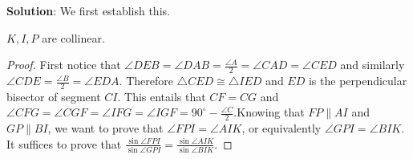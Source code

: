 \documentclass[11pt,a4paper]{article}
\begin{document}
\begin{enumerate}
	\textbf {Solution}: 
	We first establish this. 
	
	\begin{lemma}
		$K, I, P$ are collinear. 
	\end{lemma}
	
	\begin{proof}
		First notice that $\angle DEB=\angle DAB=\frac{\angle A}{2}=\angle CAD=\angle CED$ and similarly $\angle CDE=\frac{\angle B}{2}=\angle EDA$. Therefore $\triangle CED\cong\triangle IED$ and $ED$ is the perpendicular bisector of segment $CI$. This entails that $CF=CG$ and $\angle CFG=\angle CGF=\angle IFG=\angle IGF=90^{\circ}-\frac{\angle C}{2}.$Knowing that $FP\parallel AI$ and $GP\parallel BI$, we want to prove that $\angle FPI=\angle AIK$, or equivalently $\angle GPI=\angle BIK$. It suffices to prove that $\frac{\sin\angle FPI}{\sin\angle GPI}=\frac{\sin\angle AIK}{\sin\angle BIK}$.
		

\end{proof}
\end{enumerate}
\end{document}
